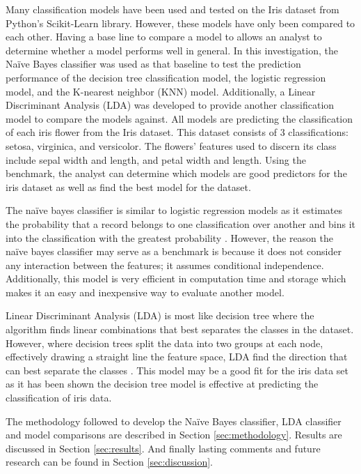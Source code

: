\documentclass[journal]{IEEEtran}
\begin{document}
Many classification models have been used and tested on the Iris dataset from Python's Scikit-Learn library. However, these models have only been compared to each other. Having a base line to compare a model to allows an analyst to determine whether a model performs well in general. In this investigation, the Naïve Bayes classifier was used as that baseline to test the prediction performance of the decision tree classification model, the logistic regression model, and the K-nearest neighbor (KNN) model. Additionally, a Linear Discriminant Analysis (LDA) was developed  to provide another classification model to compare the models against. All models are predicting the classification of each iris flower from the Iris dataset. This dataset consists of 3 classifications: setosa, virginica, and versicolor. The flowers' features used to discern its class include sepal width and length, and petal width and length. Using the benchmark, the analyst can determine which models are good predictors for the iris dataset as well as find the best model for the dataset. 

The naïve bayes classifier is similar to logistic regression models as it estimates the probability that a record belongs to one classification over another and bins it into the classification with the greatest probability \cite{b1}. However, the reason the naïve bayes classifier may serve as a benchmark is because it does not consider any interaction between the features; it assumes conditional independence. Additionally, this model is very efficient in computation time and storage which makes it an easy and inexpensive way to evaluate another model. 

Linear Discriminant Analysis (LDA) is most like decision tree where the algorithm finds linear combinations that best separates the classes in the dataset. However, where decision trees split the data into two groups at each node, effectively drawing a straight line the feature space, LDA find the direction that can best separate the classes \cite{b2}. This model may be a good fit for the iris data set as it has been shown the decision tree model is effective at predicting the classification of iris data.

The methodology followed to develop the Naïve Bayes classifier, LDA classifier and model comparisons are described in Section \ref{sec:methodology}. Results are discussed in Section \ref{sec:results}. And finally lasting comments and future research can be found in Section \ref{sec:discussion}.
\end{document}
